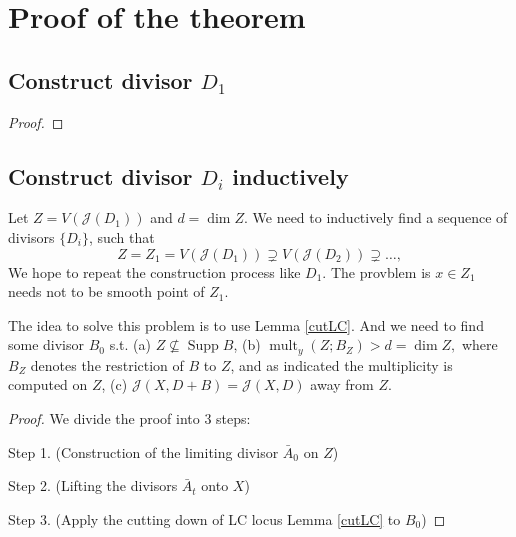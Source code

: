 \documentclass[11pt]{article}
\theoremstyle{definition}
\begin{document}
	\section{Proof of the theorem}
		\subsection{Construct divisor $D_1$}
		\begin{proof}
			
		\end{proof}
		\subsection{Construct divisor $D_i$ inductively}
		
		Let $Z = V(\mathcal{J}(D_1))$ and $d= \dim Z$. We need to inductively find a sequence of divisors $\{D_i\}$, such that $$Z= Z_1 =V(\mathcal{J}(D_1))\supsetneq V(\mathcal{J}(D_2))\supsetneq \ldots,$$We hope to repeat the construction process like $D_1$. The provblem is $x\in Z_1$ needs not to be smooth point of $Z_1$.  
		
		The idea to solve this problem is to use Lemma \ref{cutLC}. And we need to find some divisor $B_0$ s.t. 
		(a) $Z \nsubseteq \operatorname{Supp} B$,
		(b) $\operatorname{mult}_y\left(Z ; B_Z\right)>d=\operatorname{dim} Z,$ where $B_Z$ denotes the restriction of $B$ to $Z$, and as indicated the multiplicity is computed on $Z$,
		(c) $\mathcal{J}(X, D+B)=\mathcal{J}(X, D)$ away from $Z$.
		
		
		\begin{proof}
			We divide the proof into 3 steps:
			
			Step 1. (Construction of the limiting divisor $\bar{A}_0$ on $Z$)
			
			Step 2. (Lifting the divisors $\bar{A}_t$ onto $X$)
			
			Step 3. (Apply the cutting down of LC locus Lemma \ref{cutLC} to $B_0$)
			
			
			
		\end{proof}
\end{document}
